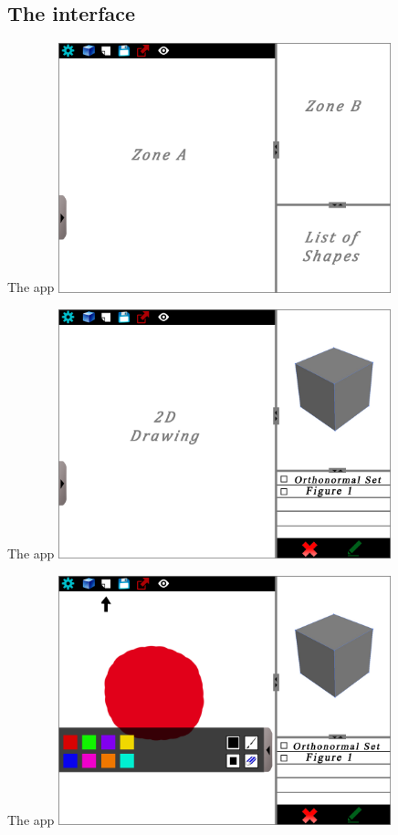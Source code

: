 \documentclass[a4paper,10pt]{beamer}
\begin{document}
		\subsection{The interface}
		
			\begin{frame}{The app}
				\includegraphics[height=205pt]{maquette/maquette_1.png}
			\end{frame}
			
			\begin{frame}{The app}
				\includegraphics[height=205pt]{maquette/maquette_2.png}
			\end{frame}
			
			\begin{frame}{The app}
				\includegraphics[height=205pt]{maquette/maquette_3.png}
			\end{frame}
			
\end{document}
